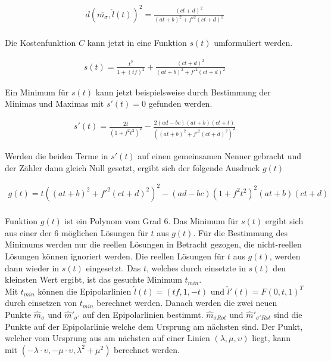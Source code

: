 \begin{gather}
	d(\bar{m_\sigma},\hat{l}(t))^2 = \frac{(ct + d)^2}{(at+b)^2+f'^2(ct+d)^2}
\end{gather} \\

Die Kostenfunktion $C$ kann jetzt in eine Funktion $s(t)$ umformuliert werden.

\begin{gather}
	s(t) = \frac{t^2}{1+(tf)^2} + \frac{(ct + d)^2}{(at+b)^2+f'^2(ct+d)^2}
\end{gather}

Ein Minimum für $s(t)$ kann jetzt beispielsweise durch Bestimmung der Minimas und Maximas mit $s'(t) = 0$ gefunden werden. 

\begin{gather}
	s'(t) = \frac{2t}{(1+f^2t^2)^2} - \frac{2(ad-bc)(at+b)(ct+t)}{((at+b)^2+f'^2(ct+d)^2)^2}
\end{gather}

Werden die beiden Terme in $s'(t)$ auf einen gemeinsamen Nenner gebracht und der Zähler dann gleich Null gesetzt, ergibt sich der folgende Ausdruck $g(t)$

\begin{gather}
	g(t) = t((at+b)^2+f'^2(ct+d)^2)^2-(ad-bc)(1+f^2t^2)^2(at+b)(ct+d)
\end{gather}\\

Funktion $g(t)$ ist ein Polynom vom Grad 6. Das Minimum für $s(t)$ ergibt sich aus einer der 6 möglichen Lösungen für $t$ aus $g(t)$. Für die Bestimmung des Minimums werden nur die reellen Lösungen in Betracht gezogen, die nicht-reellen Lösungen können ignoriert werden. Die reellen Lösungen für $t$ aus $g(t)$, werden dann wieder in $s(t)$ eingesetzt. Das $t$, welches durch einsetzte in $s(t)$ den kleinsten Wert ergibt, ist das gesuchte Minimum $t_{min}$. \\

Mit $t_{min}$ können die Epipolarlinien $\hat{l}(t)=(tf,1,-t)$ und $\hat{l}'(t) = F(0,t,1)^T$ durch einsetzen von $t_{min}$ berechnet werden. Danach werden die zwei neuen Punkte $\hat{m}_{\sigma}$ und $\hat{m}'_{\sigma'}$ auf den Epipolarlinien bestimmt. $\hat{m}_{\sigma Rot}$ und $\hat{m}'_{\sigma' Rot}$ sind die Punkte auf der Epipolarlinie welche dem Ursprung am nächsten sind. Der Punkt, welcher vom Ursprung aus am nächsten auf einer Linien $(\lambda, \mu,\upsilon)$ liegt, kann mit $(-\lambda \cdot \upsilon, -\mu \cdot \upsilon, \lambda^2+ \mu^2)$ berechnet werden.

